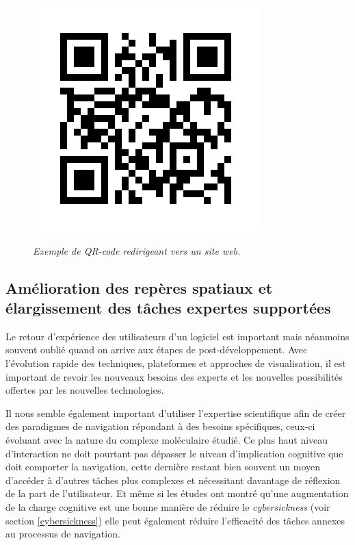 \begin{figure}[h]
  \centering
  {\includegraphics[width=.75\linewidth]{./figures/conclusion/qr_code.jpg}}
    \caption{{\it Exemple de QR-code redirigeant vers un site web.}}
  \label{Fig:qr_code}
  \hspace{0.2cm}
\end{figure}

\subsection*{Amélioration des repères spatiaux et élargissement des tâches expertes supportées}

Le retour d'expérience des utilisateurs d'un logiciel est important mais néanmoins souvent oublié quand on arrive aux étapes de post-développement. Avec l'évolution rapide des techniques, plateformes et approches de visualisation, il est important de revoir les nouveaux besoins des experts et les nouvelles possibilités offertes par les nouvelles technologies. 

Il nous semble également important d'utiliser l'expertise scientifique afin de créer des paradigmes de navigation répondant à des besoins spécifiques, ceux-ci évoluant avec la nature du complexe moléculaire étudié. Ce plus haut niveau d'interaction ne doit pourtant pas dépasser le niveau d'implication cognitive que doit comporter la navigation, cette dernière restant bien souvent un moyen d'accéder à d'autres tâches plus complexes et nécessitant davantage de réflexion de la part de l'utilisateur. Et même si les études ont montré qu'une augmentation de la charge cognitive est une bonne manière de réduire le \textit{cybersickness} (voir section \ref{cybersickness}) elle peut également réduire l'efficacité des tâches annexes au processus de navigation.

